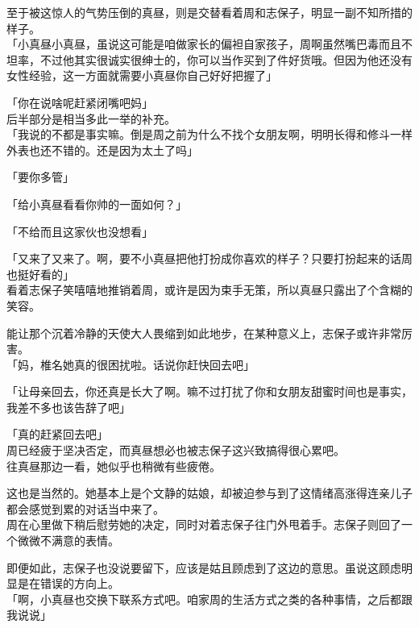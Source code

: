 至于被这惊人的气势压倒的真昼，则是交替看着周和志保子，明显一副不知所措的样子。\\

「小真昼小真昼，虽说这可能是咱做家长的偏袒自家孩子，周啊虽然嘴巴毒而且不坦率，不过他其实很诚实很绅士的，你可以当作买到了件好货哦。但因为他还没有女性经验，这一方面就需要小真昼你自己好好把握了」%

「你在说啥呢赶紧闭嘴吧妈」\\

后半部分是相当多此一举的补充。\\

「我说的不都是事实嘛。倒是周之前为什么不找个女朋友啊，明明长得和修斗一样外表也还不错的。还是因为太土了吗」

「要你多管」

「给小真昼看看你帅的一面如何？」

「不给而且这家伙也没想看」

「又来了又来了。啊，要不小真昼把他打扮成你喜欢的样子？只要打扮起来的话周也挺好看的」\\

看着志保子笑嘻嘻地推销着周，或许是因为束手无策，所以真昼只露出了个含糊的笑容。%

能让那个沉着冷静的天使大人畏缩到如此地步，在某种意义上，志保子或许非常厉害。\\

「妈，椎名她真的很困扰啦。话说你赶快回去吧」

「让母亲回去，你还真是长大了啊。嘛不过打扰了你和女朋友甜蜜时间也是事实，我差不多也该告辞了吧」

「真的赶紧回去吧」\\

周已经疲于坚决否定，而真昼想必也被志保子这兴致搞得很心累吧。\\

往真昼那边一看，她似乎也稍微有些疲倦。

这也是当然的。她基本上是个文静的姑娘，却被迫参与到了这情绪高涨得连亲儿子都会感觉到累的对话当中来了。\\

周在心里做下稍后慰劳她的决定，同时对着志保子往门外甩着手。志保子则回了一个微微不满意的表情。

即便如此，志保子也没说要留下，应该是姑且顾虑到了这边的意思。虽说这顾虑明显是在错误的方向上。\\

「啊，小真昼也交换下联系方式吧。咱家周的生活方式之类的各种事情，之后都跟我说说」

